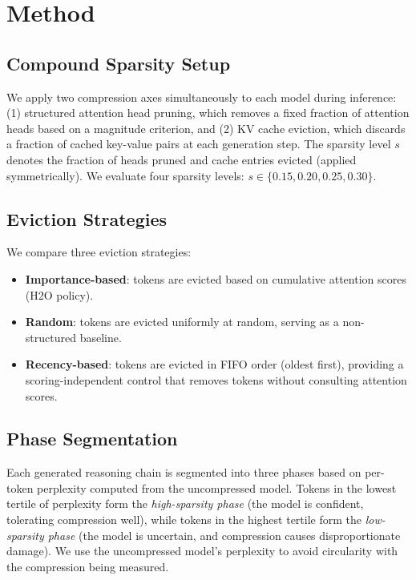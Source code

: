 \documentclass[11pt,a4paper]{article}
\begin{document}
\section{Method}\label{sec:method}

\subsection{Compound Sparsity Setup}

We apply two compression axes simultaneously to each model during inference: (1) structured attention head pruning, which removes a fixed fraction of attention heads based on a magnitude criterion, and (2) KV cache eviction, which discards a fraction of cached key-value pairs at each generation step. The sparsity level $s$ denotes the fraction of heads pruned and cache entries evicted (applied symmetrically). We evaluate four sparsity levels: $s \in \{0.15, 0.20, 0.25, 0.30\}$.

\subsection{Eviction Strategies}

We compare three eviction strategies:
\begin{itemize}
\item \textbf{Importance-based}: tokens are evicted based on cumulative attention scores (H2O policy).
\item \textbf{Random}: tokens are evicted uniformly at random, serving as a non-structured baseline.
\item \textbf{Recency-based}: tokens are evicted in FIFO order (oldest first), providing a scoring-independent control that removes tokens without consulting attention scores.
\end{itemize}

\subsection{Phase Segmentation}

Each generated reasoning chain is segmented into three phases based on per-token perplexity computed from the uncompressed model. Tokens in the lowest tertile of perplexity form the \textit{high-sparsity phase} (the model is confident, tolerating compression well), while tokens in the highest tertile form the \textit{low-sparsity phase} (the model is uncertain, and compression causes disproportionate damage). We use the uncompressed model's perplexity to avoid circularity with the compression being measured.
\end{document}
